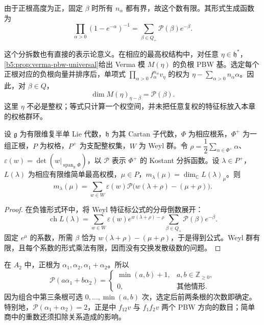 由于正根高度为正，固定 \(\beta\) 时所有 \(n_\alpha\) 都有界，故这个数有限。其形式生成函数为
\[
	\prod_{\alpha>0}(1-e^{-\alpha})^{-1} =\sum_{\beta\in Q_+}\mathcal P(\beta)e^{-\beta}.
\]

这个分拆数也有直接的表示论意义。在相应的最高权结构中，对任意 \(\eta\in\mathfrak h^*\)，\cref{b5:prop:verma-pbw-universal}给出 Verma 模 \(M(\eta)\) 的负根 PBW 基。选定每个正根对应的负根向量并排序后，单项式 \(\prod_{\alpha>0}f_\alpha^{n_\alpha}v_\eta\) 的权为 \(\eta-\sum_{\alpha>0}n_\alpha\alpha\)。因此，对 \(\beta\in Q\)，
\[
	\dim M(\eta)_{\eta-\beta}=\mathcal P(\beta).
\]
这里 \(\eta\) 不必是整权；等式只计算一个权空间，并未把任意复权的特征标放入本章的权格群环。

\begin{theorem}\label{b5:thm:kostant-multiplicity}
	设 \(\mathfrak g\) 为有限维复半单 Lie 代数，\(\mathfrak h\) 为其 Cartan 子代数，\(\Phi\) 为相应根系，\(\Phi^+\) 为一组正根，\(P\) 为权格，\(P^+\) 为支配整权集，\(W\) 为 Weyl 群。令 \(\rho=\dfrac12\sum_{\alpha\in\Phi^+}\alpha\)、\(\varepsilon(w)=\det(w|_{\operatorname{span}_{\mathbb R}\Phi})\)，以 \(\mathcal P\) 表示 \(\Phi^+\) 的 Kostant 分拆函数。设 \(\lambda\in P^+\)，\(L(\lambda)\) 为相应有限维简单最高权模，\(\mu\in P\)，\(m_\lambda(\mu)=\dim_{\mathbb C}L(\lambda)_\mu\)。则
	\begin{equation}\label{b5:eq:kostant-multiplicity}
		m_\lambda(\mu) =\sum_{w\in W}\varepsilon(w) \mathcal P\bigl(w(\lambda+\rho)-(\mu+\rho)\bigr).
	\end{equation}
\end{theorem}
\begin{proof}
	在负锥形式环中，将 Weyl 特征标公式的分母倒数展开：
	\[
		\operatorname{ch}L(\lambda) =\sum_{w\in W}\varepsilon(w)e^{w(\lambda+\rho)-\rho} \sum_{\beta\in Q_+}\mathcal P(\beta)e^{-\beta}.
	\]
	固定 \(e^\mu\) 的系数，所需 \(\beta\) 恰为 \(w(\lambda+\rho)-(\mu+\rho)\)，于是得到公式。Weyl 群有限，且每个系数的形式乘法有限，因而没有交换发散级数的问题。
\end{proof}

在 \(A_2\) 中，正根为 \(\alpha_1,\alpha_2,\alpha_1+\alpha_2\)。所以
\[
	\mathcal P(a\alpha_1+b\alpha_2)
	=\begin{cases}
		\min(a,b)+1,&a,b\in\mathbb Z_{\ge0},\\
		0,&\text{其他情形}.
	\end{cases}
\]
因为组合中第三条根可选 \(0,\ldots,\min(a,b)\) 次，选定后前两条根的次数即确定。特别地，\(\mathcal P(\alpha_1+\alpha_2)=2\)，正是中 \(f_{12}v\) 与 \(f_1f_2v\) 两个 PBW 方向的数目；简单商中的重数还须扣除关系造成的影响。

